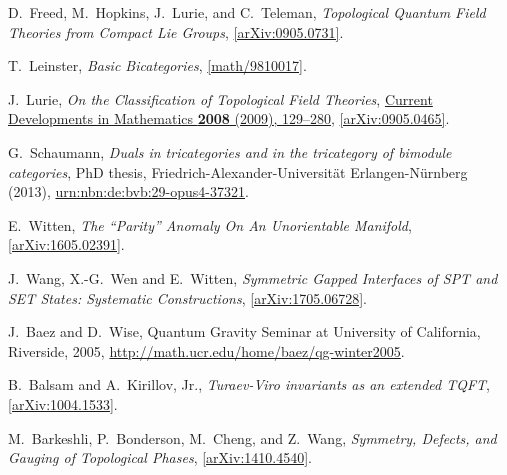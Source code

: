 \documentclass[12pt]{scrartcl}
\newcommand\arxiv[2]      {\href{http://arXiv.org/abs/#1}{#2}}
\theoremstyle{definition}
\numberwithin{equation}{section}
\numberwithin{definition}{section}
\numberwithin{figure}{section}
\begin{document}
\begin{thebibliography}{BDSPV}

D.~Freed, M.~Hopkins, J.~Lurie, and C.~Teleman,
\textsl{Topological Quantum Field Theories from Compact Lie Groups}, 
\href{http://arxiv.org/abs/0905.0731}{[\mbox{arXiv:}0905.0731]}. 

T.~Leinster, 
\textsl{Basic Bicategories}, 
\href{http://arxiv.org/abs/math/9810017}{[math/9810017]}.

J.~Lurie, 
\textsl{On the Classification of Topological Field Theories},
\href{https://projecteuclid.org/euclid.cdm/1254748657}{Current Developments in Mathematics \textbf{2008} (2009), 129--280}, 
\arxiv{0905.0465}{[arXiv:0905.0465]}.

G.~Schaumann, 
\textsl{Duals in tricategories and in the tricategory of bimodule categories}, 
PhD thesis, 
Friedrich-Alexander-Universit\"at Erlangen-N\"urnberg (2013), 
\href{http://nbn-resolving.de/urn/resolver.pl?urn:nbn:de:bvb:29-opus4-37321}{urn:nbn:de:bvb:29-opus4-37321}.

E.~Witten, 
\textsl{The ``Parity'' Anomaly On An Unorientable Manifold}, 
\href{http://arxiv.org/abs/1605.02391}{[arXiv:1605.02391]}.  

J.~Wang, X.-G.~Wen and E.~Witten, 
\textsl{Symmetric Gapped Interfaces of SPT and SET States: Systematic Constructions}, 
\href{http://arxiv.org/abs/1705.06728}{[arXiv:1705.06728]}.  





J.~Baez and D.~Wise, 
Quantum Gravity Seminar at University of California, Riverside, 2005, 
\url{http://math.ucr.edu/home/baez/qg-winter2005}.

B.~Balsam and A.~Kirillov, Jr., 
\textsl{Turaev-Viro invariants as an extended TQFT}, 
\href{http://www.arxiv.org/abs/1004.1533}{[arXiv:1004.1533]}.

M.~Barkeshli, P.~Bonderson, M.~Cheng, and Z.~Wang, 
\textsl{Symmetry, Defects, and Gauging of Topological Phases}, 
\href{http://www.arxiv.org/abs/1410.4540}{[arXiv:1410.4540]}.


\end{thebibliography}
\end{document}
